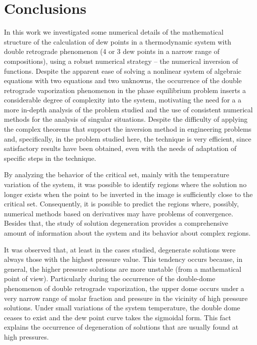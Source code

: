 \documentclass[journal=iecred,manuscript=article]{achemso}
\theoremstyle{definition}
\theoremstyle{remark}
\begin{document}
\section{Conclusions}

In this work we investigated some numerical details of the mathematical structure of the calculation of dew points in a thermodynamic system with double retrograde phenomenon (4 or 3 dew points in a narrow range of compositions), using a robust numerical strategy -- the numerical inversion of functions. Despite the apparent ease of solving a nonlinear system of algebraic equations with two equations and two unknowns, the occurrence of the double retrograde vaporization phenomenon in the phase equilibrium problem inserts a considerable degree of complexity into the system, motivating the need for a a more in-depth analysis of the problem studied and the use of consistent numerical methods for the analysis of singular situations. Despite the difficulty of applying the complex theorems that support the inversion method in engineering problems and, specifically, in the problem studied here, the technique is very efficient, since satisfactory results have been obtained, even with the needs of adaptation of specific steps in the technique.

By analyzing the behavior of the critical set, mainly with the temperature variation of the system, it was possible to identify regions where the solution no longer exists when the point to be inverted in the image is sufficiently close to the critical set. Consequently, it is possible to predict the regions where, possibly, numerical methods based on derivatives may have problems of convergence. Besides that, the study of solution degeneration provides a comprehensive amount of information about the system and its behavior about complex regions.

It was observed that, at least in the cases studied, degenerate solutions were always those with the highest pressure value. This tendency occurs because, in general, the higher pressure solutions are more unstable (from a mathematical point of view). Particularly during the occurrence of the double-dome phenomenon of double retrograde vaporization, the upper dome occurs under a very narrow range of molar fraction and pressure in the vicinity of high pressure solutions. Under small variations of the system temperature, the double dome ceases to exist and the dew point curve takes the sigmoidal form. This fact explains the occurrence of degeneration of solutions that are usually found at high pressures.
\end{document}
